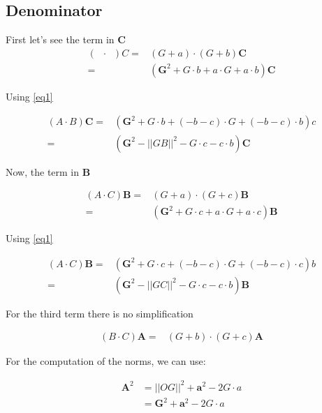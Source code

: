 \documentclass[10pt,a4paper]{article}
\newcommand{\ud}[1]{\underline{#1}}
\DeclareMathOperator{\A}{\ud{A}}
\DeclareMathOperator{\B}{\ud{B}}
\begin{document}
\subsection{Denominator}


First let's see the term in $\mathbf{C}$
\begin{align*}
 \left({\A}\cdot {\B}\right)C
	=& \left( G + a \right) \cdot \left( G + b \right) \mathbf{C} \\
	 =& (\mathbf{G}^2 +  G \cdot b	+ a \cdot G + a \cdot b    ) \mathbf{C}
\end{align*}

Using \eqref{eq1}

\begin{align}
 \left({A}\cdot {B}\right)\mathbf{C}
	 =& (\mathbf{G}^2 +  G \cdot b	+ (-b - c) \cdot G + (-b - c) \cdot b    ) c \nonumber \\
	 =& (\mathbf{G}^2 - ||GB||^2 - G \cdot c - c \cdot b)\mathbf{C}
\end{align}



Now, the term in $\mathbf{B}$


\begin{align*}
 \left({A}\cdot {C}\right)\mathbf{B} 
	=& \left( G + a \right) \cdot \left( G + c \right) \mathbf{B} \\
	 =& (\mathbf{G}^2 +  G \cdot c	+ a \cdot G + a \cdot c    ) \mathbf{B}
\end{align*}

Using \eqref{eq1}

\begin{align}
 \left({A}\cdot {C}\right)\mathbf{B}
	 =& (\mathbf{G}^2 +  G \cdot c	+ (-b - c) \cdot G + (-b - c) \cdot c    ) b \nonumber \\
	 =& (\mathbf{G}^2 - ||GC||^2 - G \cdot c - c \cdot b)\mathbf{B}
\end{align}


For the third term there is no simplification

\begin{align}
 \left({B}\cdot {C}\right)\mathbf{A}
	=& \left( G + b \right) \cdot \left( G + c \right) \mathbf{A}
\end{align}


For the computation of the norms, we can use:

\begin{align*}
\mathbf{A}^2 &= ||OG||^2 + \mathbf{a}^2 - 2 G \cdot a \\
        &=  \mathbf{G}^2 + \mathbf{a}^2 - 2 G \cdot a 
\end{align*}
\end{document}
